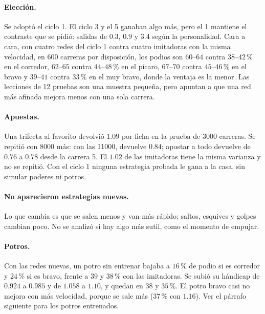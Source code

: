 \documentclass[11pt,letterpaper]{article}
\begin{document}
\paragraph{Elección.} Se adoptó el ciclo 1. El ciclo 3 y el 5 ganaban algo más, pero el 1 mantiene el contraste que se pidió: salidas de $0.3$, $0.9$ y $3.4$ según la personalidad. Cara a cara, con cuatro redes del ciclo 1 contra cuatro imitadoras con la misma velocidad, en 600 carreras por disposición, los podios son $60$--$64$ contra $38$--$42$\,\% en el corredor, $62$--$65$ contra $44$--$48$\,\% en el pícaro, $67$--$70$ contra $45$--$46$\,\% en el bravo y $39$--$41$ contra $33$\,\% en el muy bravo, donde la ventaja es la menor. Las lecciones de 12 pruebas son una muestra pequeña, pero apuntan a que una red más afinada mejora menos con una sola carrera.

\paragraph{Apuestas.} Una trifecta al favorito devolvió $1.09$ por ficha en la prueba de 3000 carreras. Se repitió con 8000 más: con las 11000, devuelve $0.84$; apostar a todo devuelve de $0.76$ a $0.78$ desde la carrera 5. El $1.02$ de las imitadoras tiene la misma varianza y no se repitió. Con el ciclo 1 ninguna estrategia probada le gana a la casa, sin simular poderes ni potros.

\paragraph{No aparecieron estrategias nuevas.} Lo que cambia es que se salen menos y van más rápido; saltos, esquives y golpes cambian poco. No se analizó si hay algo más sutil, como el momento de empujar.

\paragraph{Potros.} Con las redes nuevas, un potro sin entrenar bajaba a $16$\,\% de podio si es corredor y $24$\,\% si es bravo, frente a $39$ y $38$\,\% con las imitadoras. Se subió su hándicap de $0.924$ a $0.985$ y de $1.058$ a $1.10$, y quedan en $38$ y $35$\,\%. El potro bravo casi no mejora con más velocidad, porque se sale más ($37$\,\% con $1.16$). Ver el párrafo siguiente para los potros entrenados.
\end{document}
